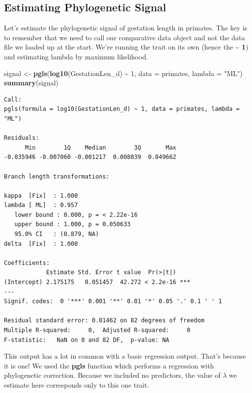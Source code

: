 \documentclass[
]{book}
\newenvironment{Shaded}{\begin{snugshade}}{\end{snugshade}}
\newcommand{\DataTypeTok}[1]{\textcolor[rgb]{0.13,0.29,0.53}{#1}}
\newcommand{\DecValTok}[1]{\textcolor[rgb]{0.00,0.00,0.81}{#1}}
\newcommand{\KeywordTok}[1]{\textcolor[rgb]{0.13,0.29,0.53}{\textbf{#1}}}
\newcommand{\NormalTok}[1]{#1}
\newcommand{\OperatorTok}[1]{\textcolor[rgb]{0.81,0.36,0.00}{\textbf{#1}}}
\newcommand{\StringTok}[1]{\textcolor[rgb]{0.31,0.60,0.02}{#1}}
\begin{document}
\hypertarget{estimating-phylogenetic-signal}{%
\subsection{Estimating Phylogenetic Signal}\label{estimating-phylogenetic-signal}}

Let's estimate the phylogenetic signal of gestation length in primates. The key is to remember that we need to call our comparative data object and not the data file we loaded up at the start. We're running the trait on its own (hence the \textbf{\textasciitilde{} 1}) and estimating lambda by maximum likelihood.

\begin{Shaded}
\begin{Highlighting}[]
\NormalTok{signal \textless{}{-}}\StringTok{ }\KeywordTok{pgls}\NormalTok{(}\KeywordTok{log10}\NormalTok{(GestationLen\_d) }\OperatorTok{\textasciitilde{}}\StringTok{ }\DecValTok{1}\NormalTok{,}
               \DataTypeTok{data =}\NormalTok{ primates,}
               \DataTypeTok{lambda =} \StringTok{"ML"}\NormalTok{)}
\KeywordTok{summary}\NormalTok{(signal)}
\end{Highlighting}
\end{Shaded}

\begin{verbatim}
Call:
pgls(formula = log10(GestationLen_d) ~ 1, data = primates, lambda = "ML")

Residuals:
      Min        1Q    Median        3Q       Max 
-0.035946 -0.007060 -0.001217  0.008039  0.049662 

Branch length transformations:

kappa  [Fix]  : 1.000
lambda [ ML]  : 0.957
   lower bound : 0.000, p = < 2.22e-16
   upper bound : 1.000, p = 0.050633
   95.0% CI   : (0.879, NA)
delta  [Fix]  : 1.000

Coefficients:
            Estimate Std. Error t value  Pr(>|t|)    
(Intercept) 2.175175   0.051457  42.272 < 2.2e-16 ***
---
Signif. codes:  0 '***' 0.001 '**' 0.01 '*' 0.05 '.' 0.1 ' ' 1

Residual standard error: 0.01462 on 82 degrees of freedom
Multiple R-squared:     0,  Adjusted R-squared:     0 
F-statistic:   NaN on 0 and 82 DF,  p-value: NA 
\end{verbatim}

This output has a lot in common with a basic regression output. That's because it is one! We used the \textbf{pgls} function which performs a regression with phylogenetic correction. Because we included no predictors, the value of \(\lambda\) we estimate here corresponds only to this one trait.
\end{document}

